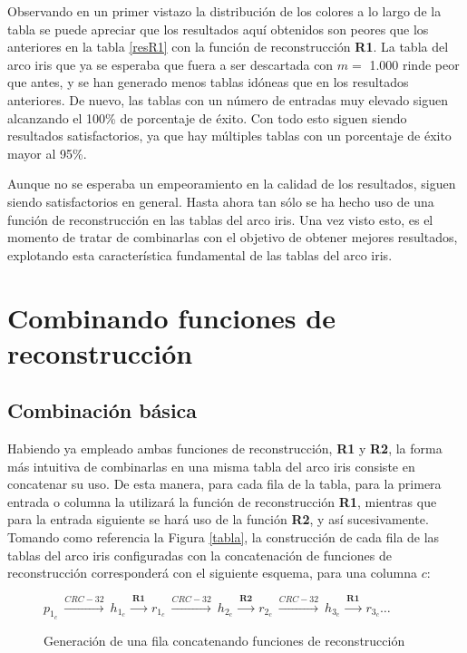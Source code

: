 \documentclass[12pt,spanish,listoffigures,listoftables]{tfgetsinf}
\begin{document}
Observando en un primer vistazo la distribución de los colores a lo largo de la tabla se puede apreciar que los resultados aquí obtenidos son peores que los anteriores en la tabla \ref{resR1} con la función de reconstrucción \textbf{R1}. La tabla del arco iris que ya se esperaba que fuera a ser descartada con $m =$ 1.000 rinde peor que antes, y se han generado menos tablas idóneas que en los resultados anteriores. De nuevo, las tablas con un número de entradas muy elevado siguen alcanzando el 100\% de porcentaje de éxito. Con todo esto siguen siendo resultados satisfactorios, ya que hay múltiples tablas con un porcentaje de éxito mayor al 95\%.

Aunque no se esperaba un empeoramiento en la calidad de los resultados, siguen siendo satisfactorios en general. Hasta ahora tan sólo se ha hecho uso de una función de reconstrucción en las tablas del arco iris. Una vez visto esto, es el momento de tratar de combinarlas con el objetivo de obtener mejores resultados, explotando esta característica fundamental de las tablas del arco iris.

\section{Combinando funciones de reconstrucción}

\subsection{Combinación básica}

Habiendo ya empleado ambas funciones de reconstrucción, \textbf{R1} y \textbf{R2}, la forma más intuitiva de combinarlas en una misma tabla del arco iris consiste en concatenar su uso. De esta manera, para cada fila de la tabla, para la primera entrada o columna la utilizará la función de reconstrucción \textbf{R1}, mientras que para la entrada siguiente se hará uso de la función \textbf{R2}, y así sucesivamente. Tomando como referencia la Figura \ref{tabla}, la construcción de cada fila de las tablas del arco iris configuradas con la concatenación de funciones de reconstrucción corresponderá con el siguiente esquema, para una columna $c$:

 \begin{figure}[H]

	\centering

	$p_{1_c}~ \xrightarrow{CRC-32}~ h_{1_c}~ \xrightarrow{\textbf{R1}}~ r_{1_c}~ \xrightarrow{CRC-32}~ h_{2_c}~ \xrightarrow{\textbf{R2}}~ r_{2_c}~ \xrightarrow{CRC-32}~ h_{3_c}~ \xrightarrow{\textbf{R1}}~ r_{3_c} \dots$ \\

	\caption{Generación de una fila concatenando funciones de reconstrucción}
	\label{filaR1R2}
	 
 \end{figure}
\end{document}
